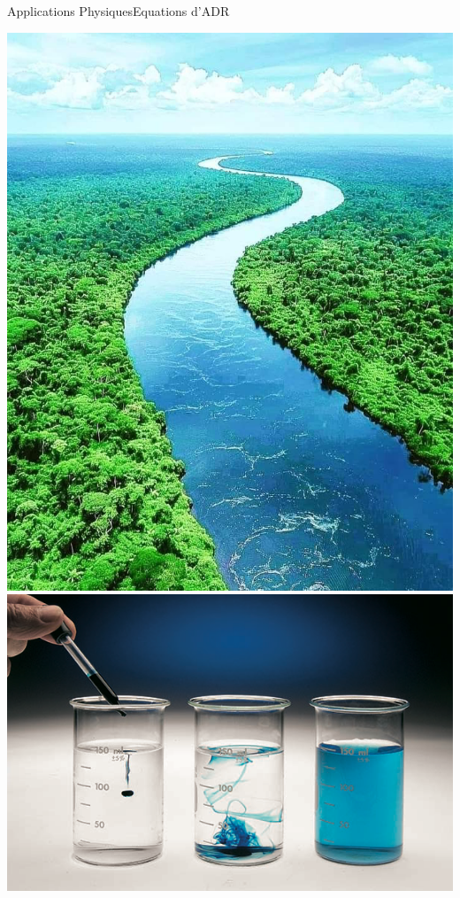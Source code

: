 \begin{frame}{Applications Physiques}{Equations d'ADR}
\begin{center}
    \includegraphics[height=0.4\textheight]{medias/1_/rio_amazonas.png}\hfill
    \includegraphics[height=0.4\textheight]{medias/1_/ink_diffusion.png}\hfill

\end{center}
\end{frame}
